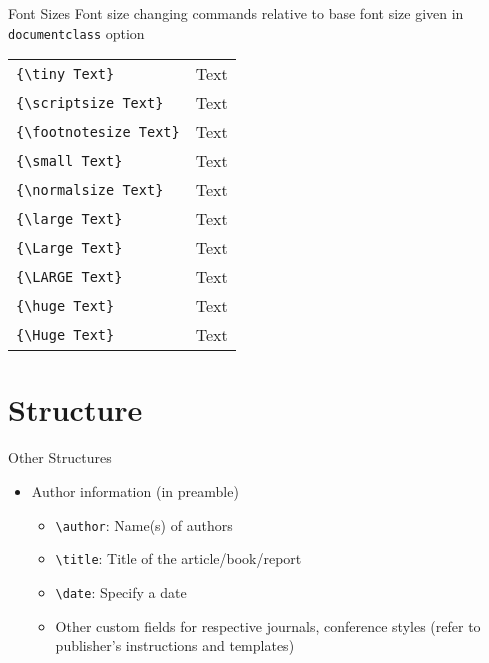 \begin{frame}[fragile]{Font Sizes}
Font size changing commands relative to base font size given in
\texttt{documentclass} option
  
\begin{center}
\begin{tabular}{ll}
\hline
\lstinline|{\tiny Text}| & {\tiny Text} \\
\lstinline|{\scriptsize Text}| & {\scriptsize Text} \\
\lstinline|{\footnotesize Text}| & {\footnotesize Text} \\
\lstinline|{\small Text}| & {\small Text} \\
\lstinline|{\normalsize Text}| & {\normalsize Text} \\
\lstinline|{\large Text}| & {\large Text} \\
\lstinline|{\Large Text}| & {\Large Text} \\
\lstinline|{\LARGE Text}| & {\LARGE Text} \\
\lstinline|{\huge Text}| & {\huge Text} \\
\lstinline|{\Huge Text}| & {\Huge Text} \\
\hline
\end{tabular}
\end{center}
\end{frame}





\section{Structure}
\begin{frame}[fragile]{Other Structures}
\begin{itemize}
  \item Author information (in preamble)
  \begin{itemize}
  \item \lstinline|\author|: Name(s) of authors
  \item \lstinline|\title|: Title of the article/book/report
  \item \lstinline|\date|: Specify a date
  \item Other custom fields for respective journals, conference styles
  (refer to publisher's instructions and templates)
  \end{itemize}
\end{itemize}
\end{frame}

